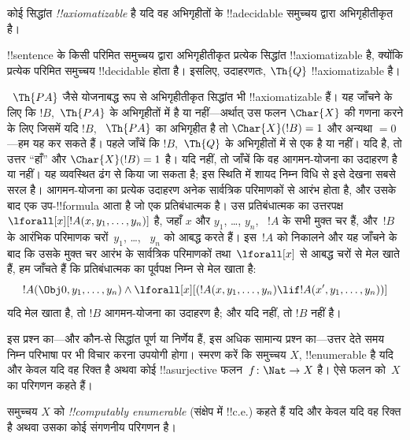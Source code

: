\documentclass[../../../include/open-logic-section]{subfiles}
\begin{document}
\begin{defn}
कोई सिद्धांत \emph{!!{axiomatizable}} है यदि वह अभिगृहीतों के
!!a{decidable} समुच्चय द्वारा अभिगृहीतीकृत है।
\end{defn}

\begin{ex}
!!{sentence} के किसी परिमित समुच्चय द्वारा अभिगृहीतीकृत प्रत्येक सिद्धांत
!!{axiomatizable} है, क्योंकि प्रत्येक परिमित समुच्चय !!{decidable} होता है।
इसलिए, उदाहरणतः, $\Th{Q}$ !!{axiomatizable} है।

~$\Th{PA}$ जैसे योजनाबद्ध रूप से अभिगृहीतीकृत सिद्धांत भी
!!{axiomatizable} हैं। यह जाँचने के लिए कि $!B$,~$\Th{PA}$ के अभिगृहीतों में
है या नहीं—अर्थात् उस फलन $\Char{X}$ की गणना करने के लिए जिसमें यदि $!B$,
~$\Th{PA}$ का अभिगृहीत है तो $\Char{X}(!B) = 1$ और अन्यथा $= 0$—हम यह कर
सकते हैं। पहले जाँचें कि $!B$,~$\Th{Q}$ के अभिगृहीतों में से एक है या नहीं।
यदि है, तो उत्तर ``हाँ'' और $\Char{X}(!B) = 1$ है। यदि नहीं, तो जाँचें कि
वह आगमन-योजना का उदाहरण है या नहीं। यह व्यवस्थित ढंग से किया जा सकता है; इस
स्थिति में शायद निम्न विधि से इसे देखना सबसे सरल है। आगमन-योजना का प्रत्येक
उदाहरण अनेक सार्वत्रिक परिमाणकों से आरंभ होता है, और उसके बाद एक उप-!!{formula}
आता है जो एक प्रतिबंधात्मक है। उस प्रतिबंधात्मक का उत्तरपक्ष
$\lforall[x][!A(x, y_1, \dots, y_n)]$ है, जहाँ $x$ और $y_1$, \dots, $y_n$,
~$!A$ के सभी मुक्त चर हैं, और~$!B$ के आरंभिक परिमाणक चरों~$y_1$, \dots,
~$y_n$ को आबद्ध करते हैं। इस~$!A$ को निकालने और यह जाँचने के बाद कि उसके
मुक्त चर आरंभ के सार्वत्रिक परिमाणकों तथा~$\lforall[x]$ से आबद्ध चरों से मेल
खाते हैं, हम जाँचते हैं कि प्रतिबंधात्मक का पूर्वपक्ष निम्न से मेल खाता है:
\[
!A(\Obj 0, y_1, \dots, y_n) \land \lforall[x][(!A(x, y_1, \dots, y_n)
\lif !A(x', y_1, \dots, y_n))]
\]
यदि मेल खाता है, तो $!B$ आगमन-योजना का उदाहरण है; और यदि नहीं, तो $!B$ नहीं है।
\end{ex}

इस प्रश्न का—और कौन-से सिद्धांत पूर्ण या निर्णेय हैं, इस अधिक सामान्य प्रश्न
का—उत्तर देते समय निम्न परिभाषा पर भी विचार करना उपयोगी होगा। स्मरण करें कि
समुच्चय $X$, !!{enumerable} है यदि और केवल यदि वह रिक्त है अथवा कोई
!!a{surjective} फलन~$f \colon \Nat \to X$ है। ऐसे फलन को~$X$ का परिगणन
कहते हैं।

\begin{defn}
समुच्चय $X$ को \emph{!!{computably enumerable}} (संक्षेप में !!{c.e.}) कहते
हैं यदि और केवल यदि वह रिक्त है अथवा उसका कोई संगणनीय परिगणन है।
\end{defn}
\end{document}
